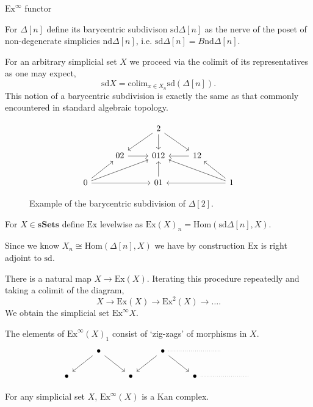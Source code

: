 \documentclass[10pt]{beamer}
\newcommand{\Hom}{{\mathrm{Hom}}}
\begin{document}
\begin{frame}{\( \mathrm{Ex}^\infty \) functor}
		\begin{definition}
		For \( \Delta[n] \) define its barycentric subdivison \( \mathrm{sd}\Delta[n] \) as the nerve of the poset of non-degenerate simplicies \( \mathrm{nd}\Delta[n] \), i.e. \( \mathrm{sd} \Delta[n]=B \mathrm{nd}\Delta[n]. \) 
	\end{definition}
	For an arbitrary simplicial set \( X \) we proceed via the colimit of its representatives as one may expect, \[ \mathrm{sd}X = \mathrm{colim}_{x \in X_n} \mathrm{sd}(\Delta[n]) .\] This notion of a barycentric subdivision is exactly the same as that commonly encountered in standard algebraic topology.
	
	\begin{figure}[!htb]
		\centering
		\[\begin{tikzcd}
			&& 2 \\
			& 02 & 012 & 12 \\
			0 && 01 && 1
			\arrow[from=1-3, to=2-2]
			\arrow[from=1-3, to=2-3]
			\arrow[from=1-3, to=2-4]
			\arrow[from=2-2, to=2-3]
			\arrow[from=2-4, to=2-3]
			\arrow[from=3-1, to=2-2]
			\arrow[from=3-1, to=2-3]
			\arrow[from=3-1, to=3-3]
			\arrow[from=3-3, to=2-3]
			\arrow[from=3-5, to=2-3]
			\arrow[from=3-5, to=2-4]
			\arrow[from=3-5, to=3-3]
		\end{tikzcd}\]
		\caption{Example of the barycentric subdivision of \(\Delta[2]\).}
		\label{fig:bary}
	\end{figure}
	\begin{definition}[Ex functor]
		For \( X \in \mathbf{sSets} \) define \( \mathrm{Ex} \) levelwise as \( \mathrm{Ex}(X)_n = \Hom(\mathrm{sd}\Delta[n],X) \).
	\end{definition}
	
	Since we know \( X_n \cong \Hom(\Delta[n],X) \) we have by construction \( \mathrm{Ex} \) is right adjoint to \( \mathrm{sd} \).
	
	There is a natural map \( X \to \mathrm{Ex}(X) \). Iterating this procedure repeatedly and taking a colimit of the diagram,\[ X \to \mathrm{Ex}(X) \to \mathrm{Ex}^2(X) \to \dots. \]
	We obtain the simplicial set \( \mathrm{Ex}^\infty X \).
	
	The elements of \( \mathrm{Ex}^\infty(X)_1 \) consist of `zig-zags' of morphisms in \( X \).
	\[\begin{tikzcd}
		& \bullet && \bullet && {} \\
		\bullet && \bullet && \bullet && {}
		\arrow[from=1-2, to=2-1]
		\arrow[from=1-2, to=2-3]
		\arrow[dotted, no head, from=1-4, to=1-6]
		\arrow[from=1-4, to=2-3]
		\arrow[from=1-4, to=2-5]
		\arrow[dotted, no head, from=2-5, to=2-7]
	\end{tikzcd}\]
	

	\begin{theorem}
		For any simplicial set \( X \), \( \mathrm{Ex}^\infty(X) \) is a Kan complex.
	\end{theorem}
\end{frame}
\end{document}
